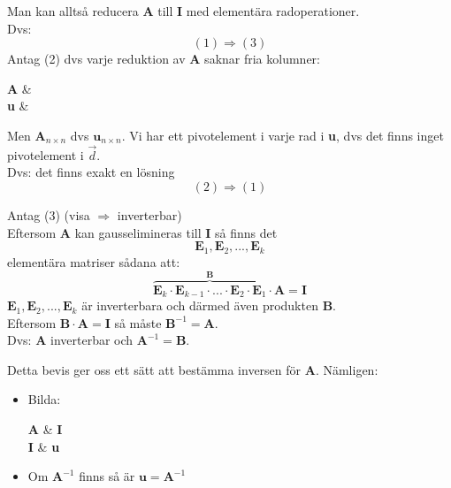 Man kan alltså reducera \textbf{A} till \textbf{I} med elementära radoperationer.\\
Dvs:
\[
    (1) \Rightarrow (3)
\]
Antag (2) dvs varje reduktion av \textbf{A} saknar fria kolumner:
\begin{elimination}[1]{1}{1.75em}{1.1}
\step
{
	\textbf{A} & 
}
{
	\\
}
\step
{
	\textbf{u} & 
}
{
	\\
}
\end{elimination}
Men $\mathbf{A}_{n \times n}$ dvs $\mathbf{u}_{n \times n}$. Vi har ett pivotelement i varje rad i \textbf{u}, dvs det finns inget pivotelement i $\vec{d}$.\\
Dvs: det finns exakt en lösning
\[
    (2) \Rightarrow (1)
\]
\begin{bevis}
	Antag (3) (visa $\Rightarrow$ inverterbar)\\
	Eftersom \textbf{A} kan gausselimineras till \textbf{I} så finns det
	\[
	    \mathbf{E}_1, \mathbf{E}_2, ..., \mathbf{E}_k
	\]
	elementära matriser sådana att:
	\[
	    \overbrace{\mathbf{E}_k \cdot \mathbf{E}_{k-1} \cdot ... \cdot \mathbf{E}_2 \cdot \mathbf{E}_1}^{\mathbf{B}} \cdot \mathbf{A} = \mathbf{I}
	\]
	$\mathbf{E}_1, \mathbf{E}_2, ..., \mathbf{E}_k$ är inverterbara och därmed även produkten \textbf{B}.\\
	Eftersom $\mathbf{B} \cdot \mathbf{A} = \mathbf{I}$ så måste $\mathbf{B}^{-1} = \mathbf{A}$.\\
	Dvs: \textbf{A} inverterbar och $\mathbf{A}^{-1} = \mathbf{B}$.
\end{bevis}
\begin{Rem}
    Detta bevis ger oss ett sätt att bestämma inversen för \textbf{A}. Nämligen:
    \begin{itemize}
    	\item Bilda:
    	\begin{elimination}[1]{1}{1.75em}{1.1}
		\step
		{
			\textbf{A} & \textbf{I}
		}
		{
			\\
		}
		\step
		{
			\textbf{I} & \textbf{u}
		}
		{
			\\
		}
		\end{elimination}
		\item Om $\mathbf{A}^{-1}$ finns så är $\mathbf{u} = \mathbf{A}^{-1}$
    \end{itemize}
\end{Rem}
\newpage
